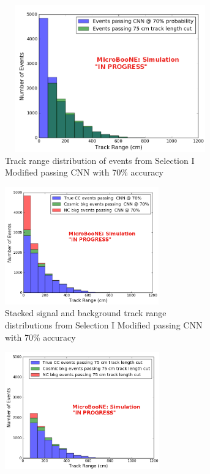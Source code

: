 \begin{figure}[htp!]
\centering
	\begin{subfigure}[b]{.9\textwidth}
	\centering
	\includegraphics[width=4in,height=2.5in]{figs/sel1mod_trackrange_wrongnorm_acc70_0706.png}
	\caption{Track range distribution of events from Selection I Modified passing CNN with 70\% accuracy}
	\label{fig:sel1mod_track}
	\end{subfigure}
	\quad
	\begin{subfigure}[b]{.45\textwidth}
	\includegraphics[width=\textwidth, height=2in]{figs/sel1mod_cnn_stackedevent_0707.png}
	\caption{Stacked signal and background track range distributions from Selection I Modified passing CNN with 70\% accuracy}
	\label{fig:sel1mod_stackedcnn}
	\end{subfigure}
	\quad
	\begin{subfigure}[b]{.45\textwidth}
	\includegraphics[width=\textwidth, height=2in]{figs/sel1mod_original_stackedevents_0707.png}

\end{subfigure}
\end{figure}
